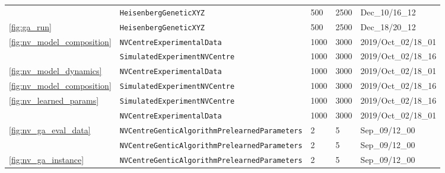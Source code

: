 \begin{tabular}{lllll}
                        & \texttt{HeisenbergGeneticXYZ} &                                      500 &                                     2500 &                           Dec\_10/16\_12 \\
\cline{1-5}
\cref{fig:ga_run} & \texttt{HeisenbergGeneticXYZ} &                                      500 &                                     2500 &                           Dec\_18/20\_12 \\
\cline{1-5}
\multirow{2}{*}{\cref{fig:nv_model_composition}} & \texttt{NVCentreExperimentalData} &                                     1000 &                                     3000 &                      2019/Oct\_02/18\_01 \\
                        & \texttt{SimulatedExperimentNVCentre} &                                     1000 &                                     3000 &                      2019/Oct\_02/18\_16 \\
\cline{1-5}
\cref{fig:nv_model_dynamics} & \texttt{NVCentreExperimentalData} &                                     1000 &                                     3000 &                      2019/Oct\_02/18\_01 \\
\cref{fig:nv_model_composition} & \texttt{SimulatedExperimentNVCentre} &                                     1000 &                                     3000 &                      2019/Oct\_02/18\_16 \\
\cline{1-5}
\multirow{2}{*}{\cref{fig:nv_learned_params}} & \texttt{SimulatedExperimentNVCentre} &                                     1000 &                                     3000 &                      2019/Oct\_02/18\_16 \\
                        & \texttt{NVCentreExperimentalData} &                                     1000 &                                     3000 &                      2019/Oct\_02/18\_01 \\
\cline{1-5}
\multirow{2}{*}{\cref{fig:nv_ga_eval_data}} & \texttt{NVCentreGenticAlgorithmPrelearnedParameters} &                                        2 &                                        5 &                           Sep\_09/12\_00 \\
                        & \texttt{NVCentreGenticAlgorithmPrelearnedParameters} &                                        2 &                                        5 &                           Sep\_09/12\_00 \\
\cline{1-5}
\multirow{2}{*}{\cref{fig:nv_ga_instance}} & \texttt{NVCentreGenticAlgorithmPrelearnedParameters} &                                        2 &                                        5 &                           Sep\_09/12\_00 \\

\end{tabular}
